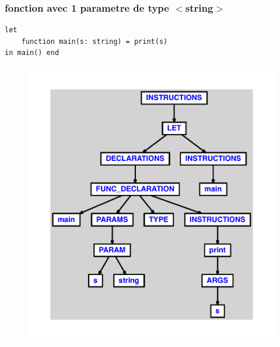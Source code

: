 \documentclass{article}
\begin{document}
\subsubsection{fonction avec 1 parametre de type $ < $string$ > $}
\begin{lstlisting}
let
	function main(s: string) = print(s)
in main() end
\end{lstlisting}
\newpage
\begin{figure}[H]
\centering
\includegraphics[max width=\textwidth]{ast/ast_240.pdf}
\end{figure}
\newpage
\end{document}
